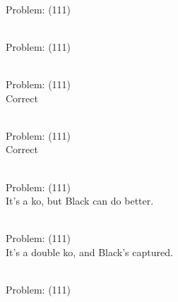 \documentclass[11pt]{article}
\begin{document}
\begin{minipage}[t]{0.5\textwidth}
  {\centering
  
\\
Problem: (111)\\
  }
\end{minipage}
\begin{minipage}[t]{0.5\textwidth}
  {\centering
  
\\
Problem: (111)\\
  }
\end{minipage}
\begin{minipage}[t]{0.5\textwidth}
  {\centering
  
\\
Problem: (111)\\
Correct\\
  }
\end{minipage}
\begin{minipage}[t]{0.5\textwidth}
  {\centering
  
\\
Problem: (111)\\
Correct\\
  }
\end{minipage}
\begin{minipage}[t]{0.5\textwidth}
  {\centering
  
\\
Problem: (111)\\
It's a ko, but Black can do better.\\
  }
\end{minipage}
\begin{minipage}[t]{0.5\textwidth}
  {\centering
  
\\
Problem: (111)\\
It's a double ko, and Black's captured.\\
  }
\end{minipage}
\begin{minipage}[t]{0.5\textwidth}
  {\centering
  
\\
Problem: (111)\\
  }
\end{minipage}
\end{document}
